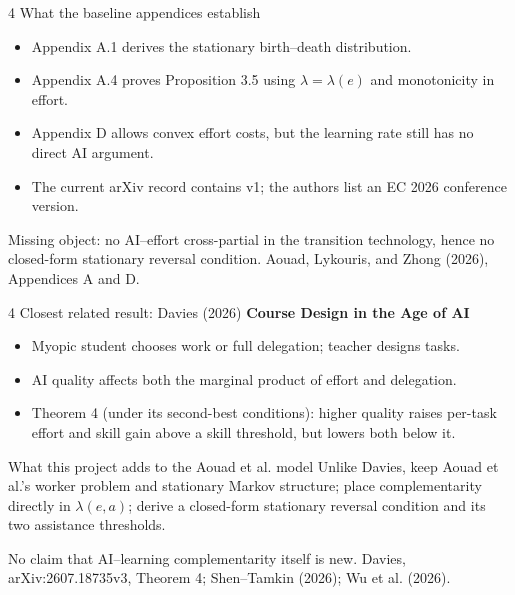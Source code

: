 \documentclass[aspectratio=169,11pt]{beamer}
\newcommand{\source}[1]{\vfill{\tiny\color{black!60}#1}}
\begin{document}
\begin{frame}{4 \textperiodcentered{} What the baseline appendices establish}
  \begin{itemize}
    \item Appendix A.1 derives the stationary birth--death distribution.
    \item Appendix A.4 proves Proposition 3.5 using
      $\lambda=\lambda(e)$ and monotonicity in effort.
    \item Appendix D allows convex effort costs, but the learning rate still
      has no direct AI argument.
    \item The current arXiv record contains v1; the authors list an EC 2026
      conference version.
  \end{itemize}
  \vspace{0.5em}
  \alert{Missing object:} no AI--effort cross-partial in the transition
  technology, hence no closed-form stationary reversal condition.
  \source{Aouad, Lykouris, and Zhong (2026), Appendices A and D.}
\end{frame}

\begin{frame}{4 \textperiodcentered{} Closest related result: Davies (2026)}
  \textbf{Course Design in the Age of AI}
  \begin{itemize}
    \item Myopic student chooses work or full delegation; teacher designs tasks.
    \item AI quality affects both the marginal product of effort and delegation.
    \item Theorem 4 (under its second-best conditions): higher quality raises
      per-task effort and skill gain above a skill threshold, but lowers both
      below it.
  \end{itemize}
  \vspace{0.4em}
  \begin{block}{What this project adds to the Aouad et al. model}
    Unlike Davies, keep Aouad et al.'s worker problem and stationary Markov
    structure; place complementarity directly in $\lambda(e,a)$; derive a
    closed-form stationary reversal condition and its two assistance thresholds.
  \end{block}
  \small No claim that AI--learning complementarity itself is new.
  \source{Davies, arXiv:2607.18735v3, Theorem 4; Shen--Tamkin (2026); Wu et al. (2026).}
\end{frame}

\end{document}
